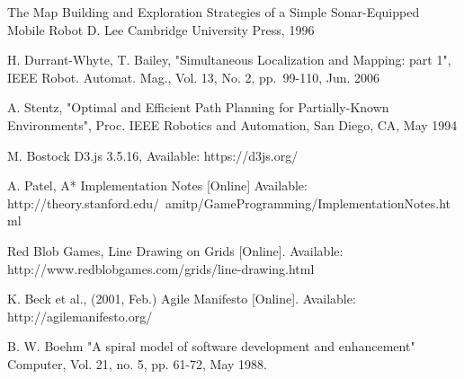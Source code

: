 \documentclass[authoryearcitations]{UoYCSproject}
\begin{document}
\begin{thebibliography}{56}
	The Map Building and Exploration Strategies of a Simple Sonar-Equipped Mobile Robot
	D. Lee
	Cambridge University Press, 1996
	
	H. Durrant-Whyte, T. Bailey,
	"Simultaneous Localization and Mapping: part 1",
	IEEE Robot. Automat. Mag.,
	Vol. 13, No. 2, pp.~99-110,
	Jun. 2006
	
	A. Stentz,
	"Optimal and Efficient Path Planning for Partially-Known Environments",
	Proc. IEEE Robotics and Automation,
	San Diego, CA,
	May 1994
	
	M. Bostock
	D3.js 3.5.16,
	Available: https://d3js.org/

	A. Patel,
	A* Implementation Notes [Online]
	Available: http://theory.stanford.edu/~amitp/GameProgramming/ImplementationNotes.html

	Red Blob Games,
	Line Drawing on Grids [Online].
	Available: http://www.redblobgames.com/grids/line-drawing.html
	
	K. Beck et al.,
	(2001, Feb.)
	Agile Manifesto [Online].
	Available: http://agilemanifesto.org/
	
	B. W. Boehm
	"A spiral model of software development and enhancement"
	Computer, 
	Vol. 21, no. 5, pp. 61-72, 
	May 1988.

\end{thebibliography}
\end{document}

